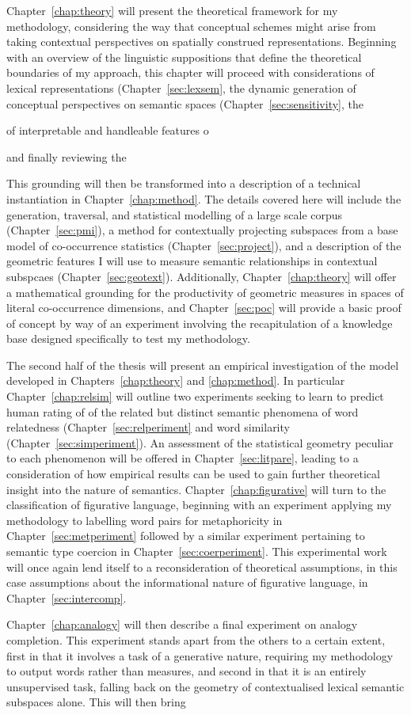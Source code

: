 Chapter~\ref{chap:theory} will present the theoretical framework for my methodology, considering the way that conceptual schemes might arise from taking contextual perspectives on spatially construed representations.  Beginning with an overview of the linguistic suppositions that define the theoretical boundaries of my approach, this chapter will proceed with considerations of lexical representations (Chapter~\ref{sec:lexsem}, the dynamic generation of conceptual perspectives on semantic spaces (Chapter~\ref{sec:sensitivity}, the 

of interpretable and handleable features o

and finally reviewing the 

This grounding will then be transformed into a description of a technical instantiation in Chapter~\ref{chap:method}.  The details covered here will include the generation, traversal, and statistical modelling of a large scale corpus (Chapter~\ref{sec:pmi}), a method for contextually projecting subspaces from a base model of co-occurrence statistics (Chapter~\ref{sec:project}), and a description of the geometric features I will use to measure semantic relationships in contextual subspcaes (Chapter~\ref{sec:geotext}).  Additionally, Chapter~\ref{chap:theory} will offer a mathematical grounding for the productivity of geometric measures in spaces of literal co-occurrence dimensions, and Chapter~\ref{sec:poc} will provide a basic proof of concept by way of an experiment involving the recapitulation of a knowledge base designed specifically to test my methodology.

The second half of the thesis will present an empirical investigation of the model developed in Chapters~\ref{chap:theory} and \ref{chap:method}.  In particular Chapter~\ref{chap:relsim} will outline two experiments seeking to learn to predict human rating of of the related but distinct semantic phenomena of word relatedness (Chapter~\ref{sec:relperiment} and word similarity (Chapter~\ref{sec:simperiment}).  An assessment of the statistical geometry peculiar to each phenomenon will be offered in Chapter~\ref{sec:litpare}, leading to a consideration of how empirical results can be used to gain further theoretical insight into the nature of semantics.  Chapter~\ref{chap:figurative} will turn to the classification of figurative language, beginning with an experiment applying my methodology to labelling word pairs for metaphoricity in Chapter~\ref{sec:metperiment} followed by a similar experiment pertaining to semantic type coercion in Chapter~\ref{sec:coerperiment}.  This experimental work will once again lend itself to a reconsideration of theoretical assumptions, in this case assumptions about the informational nature of figurative language, in Chapter~\ref{sec:intercomp}.

Chapter~\ref{chap:analogy} will then describe a final experiment on analogy completion.  This experiment stands apart from the others to a certain extent, first in that it involves a task of a generative nature, requiring my methodology to output words rather than measures, and second in that it is an entirely unsupervised task, falling back on the geometry of contextualised lexical semantic subspaces alone.  This will then bring 

